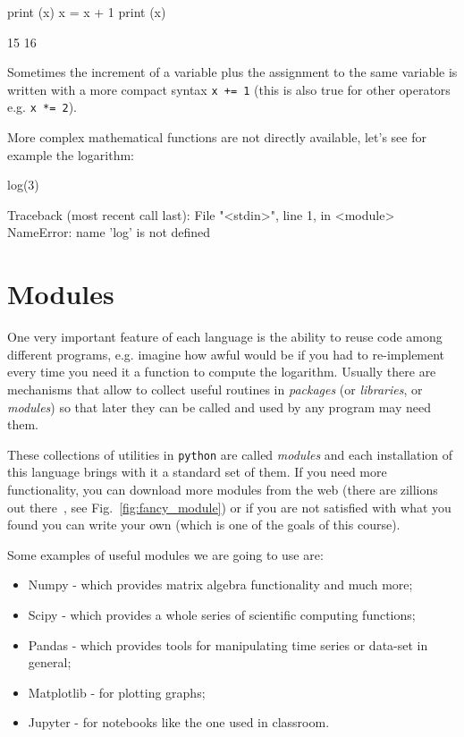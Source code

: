 \begin{ipython}
print (x)
x = x + 1
print (x)	
\end{ipython}
\begin{ioutput}
15
16
\end{ioutput}

Sometimes the increment of a variable plus the assignment to the same variable is written with a more compact syntax \texttt{x += 1} (this is also true for other operators e.g. \texttt{x *= 2}).

More complex mathematical functions are not directly available, let's see for example the logarithm:

\begin{ipython}
log(3)
\end{ipython}
\begin{ioutput}
Traceback (most recent call last):
  File "<stdin>", line 1, in <module>
NameError: name 'log' is not defined
\end{ioutput}

\section{Modules}\label{modules}

One very important feature of each language is the ability to reuse code among different programs, e.g. imagine how awful would be if you had to re-implement every time you need it a function to compute the logarithm.
Usually there are mechanisms that allow to collect useful routines in \emph{packages} (or \emph{libraries}, or \emph{modules}) so that later they can be called and used by any program may need them.

These collections of utilities in \texttt{python} are called \emph{modules} and each installation of this language brings with it a standard set of them. If you need more functionality, you can download more modules from the web (there are zillions out there~\cite{modules}, see Fig.~\ref{fig:fancy_module}) or if you are not satisfied with what you found you can write your own (which is one of the goals of this course).

Some examples of useful modules we are going to use are:

\begin{itemize}
\tightlist
\item Numpy - which provides matrix algebra functionality and much more;
\item Scipy - which provides a whole series of scientific computing
  functions;
\item Pandas - which provides tools for manipulating time series or data-set
  in general;
\item Matplotlib - for plotting graphs;
\item Jupyter - for notebooks like the one used in classroom.
\end{itemize}

